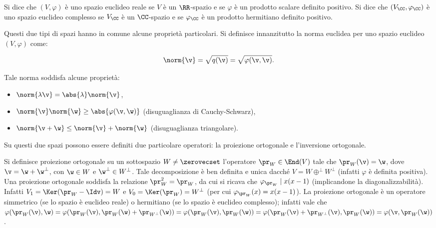\documentclass[10pt,landscape]{article}
\begin{document}
\begin{multicols}{3}
		Si dice che $(V, \varphi)$ è uno spazio euclideo reale se $V$ è un $\RR$-spazio e se
		$\varphi$ è un prodotto scalare definito positivo. Si dice che $(V_\CC, \varphi_\CC)$ è uno spazio euclideo complesso se $V_\CC$ è un $\CC$-spazio e se $\varphi_\CC$ è un
		prodotto hermitiano definito positivo.
		
		Questi due tipi di spazi hanno in comune alcune proprietà particolari. Si definisce
		innanzitutto la norma euclidea per uno spazio euclideo $(V, \varphi)$ come:
		
		\[ \norm{\v} = \sqrt{q(\v)} = \sqrt{\varphi(\v, \v)}. \]
		
		Tale norma soddisfa alcune proprietà:
		
		\begin{itemize}
			\item $\norm{\lambda \v} = \abs{\lambda} \norm{\v}$,
			\item $\norm{\v} \norm{\w} \geq \abs{\varphi(\v, \w)}$ (disuguaglianza di Cauchy-Schwarz),
			\item $\norm{\v + \w} \leq \norm{\v} + \norm{\w}$ (disuguaglianza triangolare).
		\end{itemize}
		
		Su questi due spazi possono essere definiti due particolare operatori: la
		proiezione ortogonale e l'inversione ortogonale.
		
		Si definisce proiezione ortogonale su un sottospazio $W \neq \zerovecset$ l'operatore $\pr_W \in \End(V)$ tale
		che $\pr_W(\v) = \w$, dove $\v = \w + \w^\perp$, con $\w \in W$ e $\w^\perp \in W^\perp$. Tale decomposizione è ben definita e unica dacché $V = W \oplus^\perp W^\perp$ (infatti $\varphi$ è definita positiva). Una proiezione ortogonale
		soddisfa la relazione $\pr_W^2 = \pr_W$, da cui si ricava che $\varphi_{\pr_W} \mid x(x-1)$ (implicandone la diagonalizzabilità). Infatti $V_1 = \Ker(\pr_W - \Idv) = W$ e $V_0 = \Ker(\pr_W) = W^\perp$ (per cui $\varphi_{\pr_W}(x) = x(x-1)$). La
		proiezione ortogonale è un operatore simmetrico (se lo spazio è euclideo reale)
		o hermitiano (se lo spazio è euclideo complesso); infatti vale che
		$\varphi(\pr_W(\v), \w) = \varphi(\pr_W(\v), \pr_W(\w) + \pr_{W^\perp}(\w)) =
		\varphi(\pr_W(\v), \pr_W(\w)) = \varphi(\pr_W(\v) + \pr_{W^\perp}(\v), \pr_W(\w)) =
		\varphi(\v, \pr_W(\w))$.
		

\end{multicols}
\end{document}
